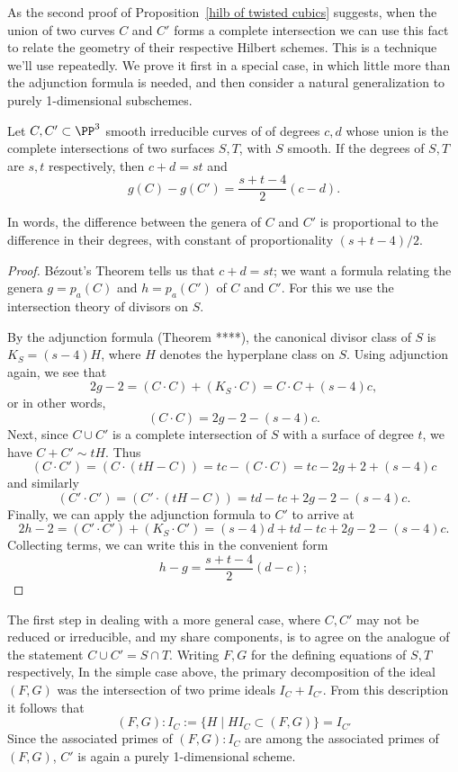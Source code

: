 As the second proof of Proposition~\ref{hilb of twisted cubics} suggests, when the union of two curves $C$ and $C'$ forms a complete intersection we can use this fact to relate the geometry of their respective Hilbert schemes. This is a technique we'll use repeatedly. We prove it first in a special case, in which little more
than the adjunction formula is needed, and then consider a natural
generalization to purely 1-dimensional subschemes.

\begin{theorem}\label{liaison genus formula-first version} Let $C, {C'}\subset \PP^3$ smooth irreducible curves of  of degrees $c,d$ whose union is the complete intersections of two surfaces $S,T$, with $S$ smooth. If the degrees of $S,T$ are $s,t$ respectively, then $c+d = st$ and 
 $$
 g(C) - g({C'}) = \frac{s+t-4}{2}(c-d).
 $$
\end{theorem}
In words, the difference between the genera of $C$ and ${C'}$ is proportional to the difference in their degrees, with constant of proportionality $(s+t-4)/2$.

\begin{proof}
 B\'ezout's Theorem tells us that $c+d = st$; we want a formula relating the genera $g = p_a(C)$ and $h = p_a({C'})$ of $C$ and ${C'}$. For this we use
 the intersection theory of divisors on $S$.

By the adjunction formula (Theorem ****), the canonical divisor class of $S$ is $K_S = (s - 4)H$, where $H$ denotes the hyperplane class on $S$. Using adjunction 
again, we see that
$$
2g-2 = (C\cdot C) + (K_S\cdot C) = C\cdot C + (s-4)c, 
$$
or in other words,
$$
(C \cdot C) = 2g-2 - (s-4)c.
$$
Next, since $C \cup {C'}$ is a complete intersection of $S$ with a surface of degree $t$, we have $C + {C'}\sim tH$. Thus 
$$
(C \cdot {C'}) = (C \cdot (tH - C)) = tc - (C \cdot C) = tc - 2g + 2 + (s-4)c
$$
and similarly
$$
({C'} \cdot {C'}) = ({C'} \cdot (tH - C)) = td - tc + 2g - 2 - (s-4)c. 
$$
Finally, we can apply the adjunction formula to ${C'}$ to arrive at
$$
2h - 2 = ({C'} \cdot {C'}) + (K_S \cdot {C'}) = (s-4)d  + td - tc + 2g - 2 - (s-4)c.
$$
Collecting terms, we can write this in the convenient form
\begin{equation}\label{linked genus formula}
h - g = \frac{s+t-4}{2}(d-c);
\end{equation}
 \end{proof}

The first step in dealing with a more general case, where $C,{C'}$ may not be reduced or irreducible, and my share components, is to agree
on the analogue of the statement $C\cup {C'} = S\cap T$. Writing $F,G$ for the defining equations of $S,T$ respectively,
In the simple case above, the primary decomposition of the ideal $(F,G)$ was the intersection of two prime ideals $I_C+I_{C'}$. From this description it
follows that
$$
(F,G):I_C := \{H \mid HI_C \subset (F,G)\} = I_{C'}
$$
Since the associated primes of $(F,G):I_C$ are among the associated primes of $(F,G)$, 
${C'}$ is again a purely 1-dimensional scheme. 

